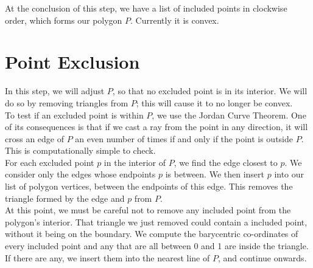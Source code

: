 \documentclass[paper=a4, fontsize=11pt]{scrartcl} %
\numberwithin{equation}{section} %
\numberwithin{figure}{section} %
\numberwithin{table}{section} %
\begin{document}
At the conclusion of this step, we have a list of included points in clockwise
order, which forms our polygon $P$. Currently it is convex.

\section{Point Exclusion}
In this step, we will adjust $P$, so that no excluded point is in its interior.
We will do so by removing triangles from $P$; this will cause it to no longer be
convex. \\

To test if an excluded point is within $P$, we use the Jordan Curve Theorem. One
of its consequences is that if we cast a ray from the point in any direction,
it will cross an edge of $P$ an even number of times if and only if the point is
outside $P$.  This is computationally simple to check. \\

For each excluded point $p$ in the interior of $P$, we find the edge closest to
$p$. We consider only the edges whose endpoints $p$ is between.  We then insert
$p$ into our list of polygon vertices, between the endpoints of this edge. This
removes the triangle formed by the edge and $p$ from $P$. \\

At this point, we must be careful not to remove any included point
from the polygon's interior.  That triangle we just removed could
contain a included point, without it being on the boundary.
We compute the barycentric co-ordinates of every included point
and any that are all between 0 and 1 are inside the triangle. \\

If there are any, we insert them into the nearest line of $P$, and continue
onwards.
\end{document}
